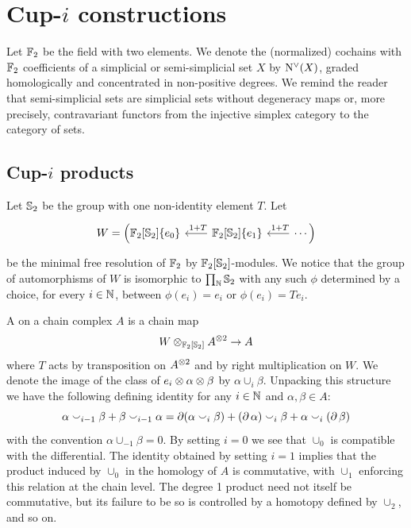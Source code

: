 
\section{Cup-$i$ constructions}\label{s:statement}

Let ${\mathbb{F}_2}$ be the field with two elements.
We denote the (normalized) cochains with ${\mathbb{F}_2}$ coefficients of a simplicial or semi-simplicial set $X$ by $\operatorname{N^{\vee}}(X)$, graded homologically and concentrated in non-positive degrees.
We remind the reader that semi-simplicial sets are simplicial sets without degeneracy maps or, more precisely, contravariant functors from the injective simplex category to the category of sets.

\subsection{Cup-$i$ products}

Let $\mathbb{S}_2$ be the group with one non-identity element $T$.
Let
\[
\begin{tikzcd}[column sep=20pt]
W = \Big(
\Ftwo[\Sym_2]\{e_0\} &
\Ftwo[\Sym_2]\{e_1\} \arrow[l, "\ 1+T"'] &
\arrow[l, "\ 1+T"'] \dotsb \Big)
\end{tikzcd}
\]
be the minimal free resolution of ${\mathbb{F}_2}$ by ${\mathbb{F}_2}[\mathbb{S}_2]$-modules.
We notice that the group of automorphisms of $W$ is isomorphic to $\prod_{\mathbb{N}} \mathbb{S}_2$ with any such $\phi$ determined by a choice, for every $i \in \mathbb{N}$, between $\phi(e_i) = e_i$ or $\phi(e_i) = Te_i$.

A  on a chain complex $A$ is a chain map
\[
W \otimes_{{\mathbb{F}_2}[\mathbb{S}_2]} A^{\otimes 2} \to A
\]
where $T$ acts by transposition on $A^{\otimes 2}$ and by right multiplication on $W$.
We denote the image of the class of $e_i \otimes \alpha \otimes \beta$ by $\alpha \cup_i \beta$.
Unpacking this structure we have the following defining identity for any $i \in \mathbb{N}$ and $\alpha, \beta \in A$:
\[
\alpha \smallsmile_{i-1} \beta + \beta \smallsmile_{i-1} \alpha =
\operatorname{\partial} (\alpha \smallsmile_{i} \beta) + (\operatorname{\partial}\alpha) \smallsmile_{i} \beta + \alpha \smallsmile_{i} (\operatorname{\partial}\beta)
\]
with the convention $\alpha \cup_{-1} \beta = 0$.
By setting $i = 0$ we see that $\cup_0$ is compatible with the differential.
The identity obtained by setting $i = 1$ implies that the product induced by $\cup_0$ in the homology of $A$ is commutative, with $\cup_1$ enforcing this relation at the chain level.
The degree 1 product need not itself be commutative, but its failure to be so is controlled by a homotopy defined by $\cup_2$, and so on.

